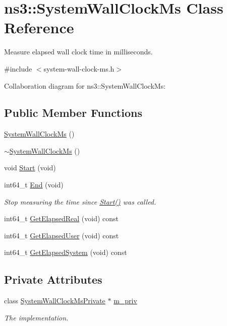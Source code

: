 \hypertarget{classns3_1_1SystemWallClockMs}{}\section{ns3\+:\+:System\+Wall\+Clock\+Ms Class Reference}
\label{classns3_1_1SystemWallClockMs}


Measure elapsed wall clock time in milliseconds.  




{\ttfamily \#include $<$system-\/wall-\/clock-\/ms.\+h$>$}



Collaboration diagram for ns3\+:\+:System\+Wall\+Clock\+Ms\+:
\subsection*{Public Member Functions}
\begin{DoxyCompactItemize}
\item 
\hyperlink{classns3_1_1SystemWallClockMs_a2b44cc2399541bdcd932b0ab88a61d67}{System\+Wall\+Clock\+Ms} ()
\item 
\hyperlink{classns3_1_1SystemWallClockMs_ab6a615ca423a43e953517cdc6139d342}{$\sim$\+System\+Wall\+Clock\+Ms} ()
\item 
void \hyperlink{classns3_1_1SystemWallClockMs_a1dcad7d164d74380ce65a76e0ec30b3f}{Start} (void)
\item 
int64\+\_\+t \hyperlink{classns3_1_1SystemWallClockMs_a57d41e579c7b4abbd1f1b7c578797906}{End} (void)
\begin{DoxyCompactList}\small\item\em Stop measuring the time since \hyperlink{classns3_1_1SystemWallClockMs_a1dcad7d164d74380ce65a76e0ec30b3f}{Start()} was called. \end{DoxyCompactList}\item 
int64\+\_\+t \hyperlink{classns3_1_1SystemWallClockMs_a19caefe93d929c04e4e8675fa976f242}{Get\+Elapsed\+Real} (void) const 
\item 
int64\+\_\+t \hyperlink{classns3_1_1SystemWallClockMs_a36a7895909a4a7510f70d11a11def875}{Get\+Elapsed\+User} (void) const 
\item 
int64\+\_\+t \hyperlink{classns3_1_1SystemWallClockMs_ad521c3c961769e7a8b214ea4c12ae018}{Get\+Elapsed\+System} (void) const 
\end{DoxyCompactItemize}
\subsection*{Private Attributes}
\begin{DoxyCompactItemize}
\item 
class \hyperlink{classns3_1_1SystemWallClockMsPrivate}{System\+Wall\+Clock\+Ms\+Private} $\ast$ \hyperlink{classns3_1_1SystemWallClockMs_a0a022abb3a76bfc57f07ff95f48d2a7b}{m\+\_\+priv}
\begin{DoxyCompactList}\small\item\em The implementation. \end{DoxyCompactList}\end{DoxyCompactItemize}


